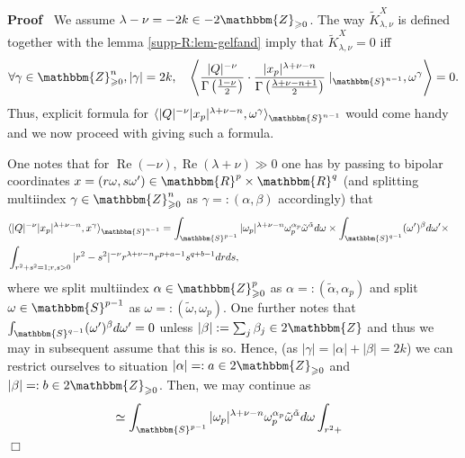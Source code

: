 \documentclass[12pt]{article}
\newcommand{\assign}{:=}
\newcommand{\tmop}[1]{\ensuremath{\operatorname{#1}}}
\renewenvironment{proof}{\noindent\textbf{Proof\ }}{\hspace*{\fill}$\Box$\medskip}
\theoremstyle{remark}
\begin{document}
\begin{proof}
  We assume $\lambda - \nu = - 2 k \in - 2\mathbbm{Z}_{\geqslant 0}$. The way
  $\tilde{K}_{\lambda, \nu}^X$ is defined together with the lemma
  \ref{supp-R:lem-gelfand} imply that $\tilde{K}_{\lambda, \nu}^X = 0$ iff
  \[ \forall \gamma \in \mathbbm{Z}_{\geqslant 0}^n, | \gamma | = 2 k, \quad
     \left\langle \frac{| Q |^{- \nu}}{\Gamma \left( \frac{1 - \nu}{2}
     \right)} \cdot \frac{| x_p |^{\lambda + \nu - n}}{\Gamma \left(
     \frac{\lambda + \nu - n + 1}{2} \right)} \mid_{\mathbbm{S}^{n - 1}},
     \omega^{\gamma} \right\rangle = 0. \]
  Thus, explicit formula for $\langle | Q |^{- \nu} | x_p |^{\lambda + \nu -
  n}, \omega^{\gamma} \rangle_{\mathbbm{S}^{n - 1}}$ would come handy and we
  now proceed with giving such a formula.
  
  One notes that for $\tmop{Re} (- \nu), \tmop{Re} (\lambda + \nu) \gg 0$ one
  has by passing to bipolar coordinates $x = (r \omega, s \omega') \in
  \mathbbm{R}^p \times \mathbbm{R}^q$ (and splitting multiindex $\gamma \in
  \mathbbm{Z}_{\geqslant 0}^n$ as $\gamma = : (\alpha, \beta)$ accordingly)
  that
  \begin{eqnarray}
    & \langle | Q |^{- \nu} | x_p |^{\lambda + \nu - n}, x^{\gamma}
    \rangle_{\mathbbm{S}^{n - 1}} = \int_{\mathbbm{S}^{p - 1}} | \omega_p
    |^{\lambda + \nu - n} \omega^{\alpha_p}_p \tilde{\omega}^{\tilde{\alpha}}
    d \omega \times \int_{\mathbbm{S}^{q - 1}} (\omega')^{\beta} d \omega'
    \times &  \nonumber\\
    & \int_{r^2 + s^2 = 1 ; r, s > 0} | r^2 - s^2 |^{- \nu} r^{\lambda + \nu
    - n} r^{p + a - 1} s^{q + b - 1} d r d s, &  \nonumber
  \end{eqnarray}
  where we split multiindex $\alpha \in \mathbbm{Z}^p_{\geqslant 0}$ as
  $\alpha = : (\tilde{\alpha}, \alpha_p)$ and split $\omega \in \mathbbm{S}^{p
  - 1}$ as $\omega = : (\tilde{\omega}, \omega_p)$. One further notes that
  $\int_{\mathbbm{S}^{q - 1}} (\omega')^{\beta} d \omega' = 0$ unless $| \beta
  | \assign \sum_j \beta_j \in 2\mathbbm{Z}$ and thus we may in subsequent
  assume that this is so. Hence, (as $| \gamma | = | \alpha | + | \beta | = 2
  k$) we can restrict ourselves to situation $| \alpha | = : a \in
  2\mathbbm{Z}_{\geqslant 0}$ and $| \beta | = : b \in 2\mathbbm{Z}_{\geqslant
  0}$. Then, we may continue as
  \begin{eqnarray}
    & \simeq \int_{\mathbbm{S}^{p - 1}} | \omega_p |^{\lambda + \nu - n}
    \omega^{\alpha_p}_p \tilde{\omega}^{\tilde{\alpha}} d \omega \int_{r^2 +
}
\end{eqnarray}
\end{proof}
\end{document}
